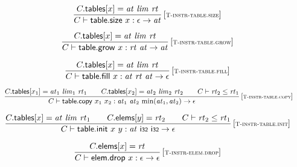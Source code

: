 $$
\begin{array}{@{}c@{}}\displaystyle
\frac{
C{.}\mathsf{tables}{}[x] = {\mathit{at}}~{\mathit{lim}}~{\mathit{rt}}
}{
C \vdash \mathsf{table{.}size}~x : \epsilon \rightarrow {\mathit{at}}
} \, {[\textsc{\scriptsize T{-}instr{-}table.size}]}
\qquad
\end{array}
$$

$$
\begin{array}{@{}c@{}}\displaystyle
\frac{
C{.}\mathsf{tables}{}[x] = {\mathit{at}}~{\mathit{lim}}~{\mathit{rt}}
}{
C \vdash \mathsf{table{.}grow}~x : {\mathit{rt}}~{\mathit{at}} \rightarrow {\mathit{at}}
} \, {[\textsc{\scriptsize T{-}instr{-}table.grow}]}
\qquad
\end{array}
$$

$$
\begin{array}{@{}c@{}}\displaystyle
\frac{
C{.}\mathsf{tables}{}[x] = {\mathit{at}}~{\mathit{lim}}~{\mathit{rt}}
}{
C \vdash \mathsf{table{.}fill}~x : {\mathit{at}}~{\mathit{rt}}~{\mathit{at}} \rightarrow \epsilon
} \, {[\textsc{\scriptsize T{-}instr{-}table.fill}]}
\qquad
\end{array}
$$

$$
\begin{array}{@{}c@{}}\displaystyle
\frac{
C{.}\mathsf{tables}{}[x_1] = {\mathit{at}}_1~{\mathit{lim}}_1~{\mathit{rt}}_1
 \qquad
C{.}\mathsf{tables}{}[x_2] = {\mathit{at}}_2~{\mathit{lim}}_2~{\mathit{rt}}_2
 \qquad
C \vdash {\mathit{rt}}_2 \leq {\mathit{rt}}_1
}{
C \vdash \mathsf{table{.}copy}~x_1~x_2 : {\mathit{at}}_1~{\mathit{at}}_2~{\mathrm{min}}({\mathit{at}}_1, {\mathit{at}}_2) \rightarrow \epsilon
} \, {[\textsc{\scriptsize T{-}instr{-}table.copy}]}
\qquad
\end{array}
$$

$$
\begin{array}{@{}c@{}}\displaystyle
\frac{
C{.}\mathsf{tables}{}[x] = {\mathit{at}}~{\mathit{lim}}~{\mathit{rt}}_1
 \qquad
C{.}\mathsf{elems}{}[y] = {\mathit{rt}}_2
 \qquad
C \vdash {\mathit{rt}}_2 \leq {\mathit{rt}}_1
}{
C \vdash \mathsf{table{.}init}~x~y : {\mathit{at}}~\mathsf{i{\scriptstyle 32}}~\mathsf{i{\scriptstyle 32}} \rightarrow \epsilon
} \, {[\textsc{\scriptsize T{-}instr{-}table.init}]}
\qquad
\end{array}
$$

$$
\begin{array}{@{}c@{}}\displaystyle
\frac{
C{.}\mathsf{elems}{}[x] = {\mathit{rt}}
}{
C \vdash \mathsf{elem{.}drop}~x : \epsilon \rightarrow \epsilon
} \, {[\textsc{\scriptsize T{-}instr{-}elem.drop}]}
\qquad
\end{array}
$$

